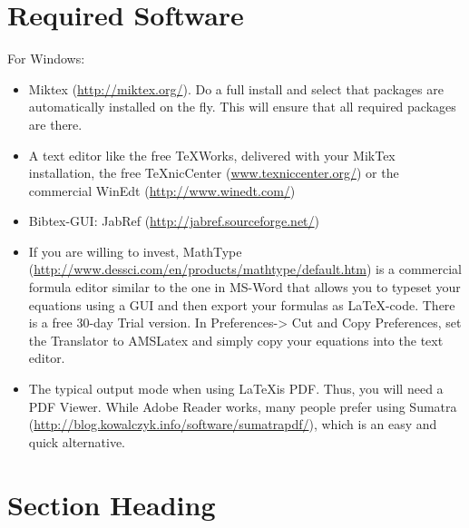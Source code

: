 \documentclass[a4paper,12pt]{scrartcl} %
\begin{document}
\clearpage                %




\tableofcontents
\clearpage
\listoffigures
\clearpage
\listoftables
\clearpage
\printglossary[type=\acronymtype,style=long,title=List of Abbreviations]
\clearpage
\printglossary[type=symbolslist,style=long,title=List of Symbols]
\clearpage


\setcounter{page}{1}        %

\section{Required Software}

For Windows:
\begin{itemize} %
   \item Miktex (\url{http://miktex.org/}). Do a full install and select that packages are automatically installed on the fly. This will ensure that all required packages are there.
   \item A text editor like the free TeXWorks, delivered with your MikTex installation, the free TeXnicCenter (\url{www.texniccenter.org/}) or the commercial WinEdt (\url{http://www.winedt.com/})
   \item Bibtex-GUI: JabRef (\url{http://jabref.sourceforge.net/})
   \item If you are willing to invest, MathType (\url{http://www.dessci.com/en/products/mathtype/default.htm}) is a commercial formula editor similar to the one in MS-Word that allows you to typeset your equations using a GUI and then export your formulas as \LaTeX-code. There is a free 30-day Trial version. In Preferences-> Cut and Copy Preferences, set the Translator to AMSLatex and simply copy your equations into the text editor.
   \item The typical output mode when using \LaTeX is PDF. Thus, you will need a PDF Viewer. While Adobe Reader works, many people prefer using Sumatra (\url{http://blog.kowalczyk.info/software/sumatrapdf/}), which is an easy and quick alternative.
\end{itemize}

\section{Section Heading} \label{sec:Section1}
\end{document}
